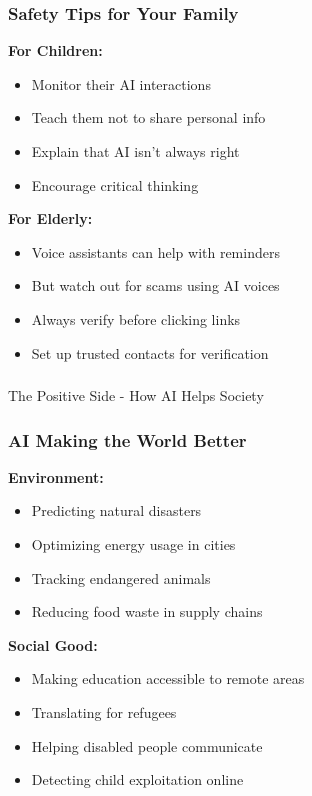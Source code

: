 \begin{frame}[fragile]\frametitle{Safety Tips for Your Family}

{\bf For Children:}
\begin{itemize}
\item Monitor their AI interactions
\item Teach them not to share personal info
\item Explain that AI isn't always right
\item Encourage critical thinking
\end{itemize}

{\bf For Elderly:}
\begin{itemize}
\item Voice assistants can help with reminders
\item But watch out for scams using AI voices
\item Always verify before clicking links
\item Set up trusted contacts for verification
\end{itemize}
\end{frame}

\begin{frame}[fragile]\frametitle{}
\begin{center}
{\Large The Positive Side - How AI Helps Society}
\end{center}
\end{frame}

\begin{frame}[fragile]\frametitle{AI Making the World Better}

{\bf Environment:}
\begin{itemize}
\item Predicting natural disasters
\item Optimizing energy usage in cities
\item Tracking endangered animals
\item Reducing food waste in supply chains
\end{itemize}

{\bf Social Good:}
\begin{itemize}
\item Making education accessible to remote areas
\item Translating for refugees
\item Helping disabled people communicate
\item Detecting child exploitation online
\end{itemize}
\end{frame}

